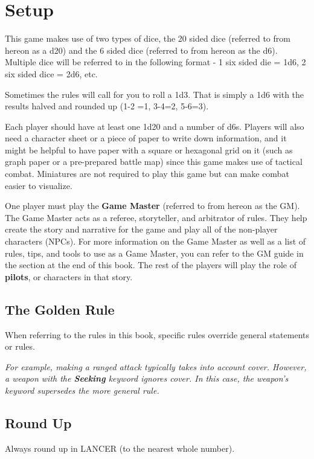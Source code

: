 \section{Setup}

This game makes use of two types of dice, the 20 sided dice (referred to from hereon as a d20)
and the 6 sided dice (referred to from hereon as the d6). Multiple dice will be referred to in the
following format - 1 six sided die = 1d6, 2 six sided dice = 2d6, etc.

Sometimes the rules will call for you to roll a 1d3. That is simply a 1d6 with the results halved and
rounded up (1-2 =1, 3-4=2, 5-6=3).

Each player should have at least one 1d20 and a number of d6s. Players will also need a
character sheet or a piece of paper to write down information, and it might be helpful to have
paper with a square or hexagonal grid on it (such as graph paper or a pre-prepared battle map)
since this game makes use of tactical combat. Miniatures are not required to play this game but
can make combat easier to visualize.

One player must play the \textbf{Game Master} (referred to from hereon as the GM). The Game Master
acts as a referee, storyteller, and arbitrator of rules. They help create the story and narrative for
the game and play all of the non-player characters (NPCs). For more information on the Game
Master as well as a list of rules, tips, and tools to use as a Game Master, you can refer to the GM
guide in the section at the end of this book. The rest of the players will play the role of \textbf{pilots}, or
characters in that story.

\subsection*{The Golden Rule}

When referring to the rules in this book, specific rules override general statements or rules.

\textit{For example, making a ranged attack typically takes into account cover. However, a weapon with
the \textbf{Seeking} keyword ignores cover. In this case, the weapon's keyword supersedes the more
general rule.}

\subsection*{Round Up}

Always round up in LANCER (to the nearest whole number).